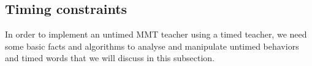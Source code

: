 \newcommand{\Zone}[1]{\mathsf{Zone}({#1})}

\subsection{Timing constraints}

In order to implement an untimed MMT teacher using a timed teacher, we need some basic facts and algorithms to
analyse and manipulate untimed behaviors and timed words that we will discuss in this subsection.


%
%

